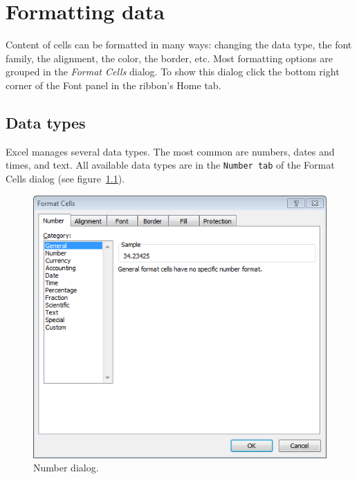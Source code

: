 
\chapter{Formatting data}

Content of cells can be formatted in many ways: changing the data type, the font family, the alignment, the color, the border, etc. Most formatting options are grouped in the \emph{Format Cells} dialog. To show this dialog click the bottom right corner of the Font panel in the ribbon's Home tab.

\section{Data types}\hypertarget{data-types}{}\label{data-types}

Excel manages several data types. The most common are numbers, dates and times, and text. All available data types are
in the \texttt{Number tab} of the Format Cells dialog (see figure~\ref{img-number_dialog}).

\begin{figure}[htbp]
\begin{center}
\includegraphics[scale=0.7]{../img/number_dialog.png}
\end{center}
\caption{Number dialog.}
\label{img-number_dialog}
\end{figure}

